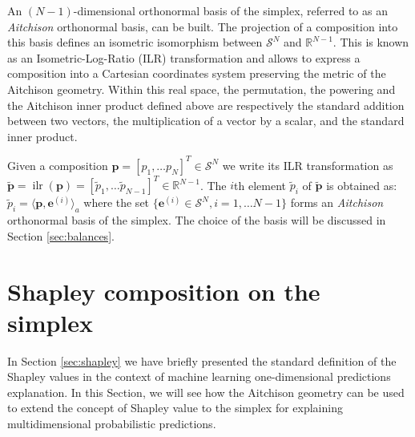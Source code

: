 \documentclass{article}
\theoremstyle{plain}
\theoremstyle{definition}
\theoremstyle{remark}
\DeclareMathOperator{\ilr}{ilr}
\begin{document}
An $(N-1)$-dimensional orthonormal basis of the simplex, referred to as an \emph{Aitchison} orthonormal basis, can be built. The projection of a composition into this basis defines an isometric isomorphism between $\mathcal{S}^N$ and $\mathbb{R}^{N-1}$. This is known as an Isometric-Log-Ratio (ILR) transformation \cite{egozcue2003isometric} and allows to express a composition into a Cartesian coordinates system preserving the metric of the Aitchison geometry. Within this real space, the permutation, the powering and the Aitchison inner product defined above are respectively the standard addition between two vectors, the multiplication of a vector by a scalar, and the standard inner product.

Given a composition $\bm{p} = \left[ p_1,\dots p_N \right]^T \in \mathcal{S}^N$ we write its ILR transformation as $\tilde{\bm{p}} = \ilr \left( \bm{p} \right) = \left[ \tilde{p}_1,\dots \tilde{p}_{N-1} \right]^T \in \mathbb{R}^{N-1}$. The $i$th element $\tilde{p}_i$ of $\tilde{\bm{p}}$ is obtained as: $\tilde{p}_i = \langle \bm{p}, \bm{e}^{(i)} \rangle_a$ where the set $\{\bm{e}^{(i)} \in \mathcal{S}^N, i=1,\dots N-1\}$ forms an \emph{Aitchison} orthonormal basis of the simplex. The choice of the basis will be discussed in Section \ref{sec:balances}.

\section{Shapley composition on the simplex}
\label{sec:shapcompo}

In Section \ref{sec:shapley} we have briefly presented the standard definition of the Shapley values in the context of machine learning one-dimensional predictions explanation. In this Section, we will see how the Aitchison geometry can be used to extend the concept of Shapley value to the simplex for explaining multidimensional probabilistic predictions.
\end{document}
